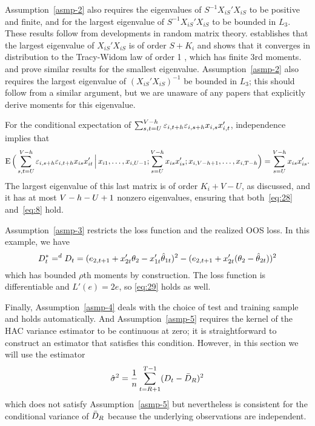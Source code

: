 \documentclass[12pt]{article}
\begin{document}
Assumption~\ref{asmp-2} also requires the eigenvalues of $S^{-1}
X_{iS}'X_{iS}$ to be positive and finite, and for the largest
eigenvalue of $S^{-1} X_{iS}'X_{iS}$ to be bounded in $L_3$.  These
results follow from developments in random matrix theory.
\citet{Gem:80} establishes that the largest eigenvalue of
$X_{iS}'X_{iS}$ is of order $S + K_i$ and \citet{Joh:01} shows that it
converges in distribution to the Tracy-Widom law of order 1
\citep{TrW:96}, which has finite 3rd moments. \citet{Sil:85} and
\citet{BFP:98} prove similar results for the smallest eigenvalue.
Assumption~\ref{asmp-2} also requires the largest eigenvalue of
$(X_{iS}'X_{iS})^{-1}$ be bounded in $L_3$; this should follow from a
similar argument, but we are unaware of any papers that explicitly
derive moments for this eigenvalue.

For the conditional expectation of %
$\sum_{s,t=U}^{V-h} \varepsilon_{i,t+h} \varepsilon_{i,s+h} x_{i,s} x_{i,t}'$,
independence implies that
\begin{equation*}
  \operatorname{E}\Big(
  \sum_{s,t=U}^{V-h} \varepsilon_{i,s+h} \varepsilon_{i,t+h} x_{is}x_{it}'
  \,\Big|\,
  x_{i1},\dots,x_{i,U-1};
  \sum_{s=U}^{V-h} x_{is} x_{is}';
  x_{i,V-h+1},\dots,x_{i,T-h}
  \Big)
  = \sum_{s=U}^{V-h} x_{is} x_{is}'.
\end{equation*}
The largest eigenvalue of this last matrix is of order $K_i + V - U$,
as discussed, and it has at most $V-h - U + 1$ nonzero eigenvalues,
ensuring that both~\eqref{eq:28} and~\eqref{eq:8} hold.

Assumption~\ref{asmp-3} restricts the loss function and the realized
OOS loss. In this example, we have
\begin{equation*}
  D_t^* =^d D_t = (e_{2,t+1} + x_{2t}'\theta_2 - x_{1t}'\hat\theta_{1t})^2
  - (e_{2,t+1} + x_{2t}'(\theta_2 - \hat\theta_{2t}))^2
\end{equation*}
which has bounded $\rho$th moments by construction. The loss function
is differentiable and $L'(e) = 2 e$, so \eqref{eq:29} holds as well.

Finally, Assumption~\ref{asmp-4} deals with the choice of test and
training sample and holds automatically. And Assumption~\ref{asmp-5}
requires the kernel of the HAC variance estimator to be continuous at
zero; it is straightforward to construct an estimator that satisfies
this condition. However, in this section we will use the estimator
\begin{equation*}
  \hat{\sigma}^2 = \frac{1}{n} \sum_{t=R+1}^{T-1} (D_t - \bar{D}_{R})^2
\end{equation*}
which does not satisfy Assumption~\ref{asmp-5} but nevertheless is
consistent for the conditional variance of $\bar{D}_{R}$ because the
underlying observations are independent.
\end{document}
